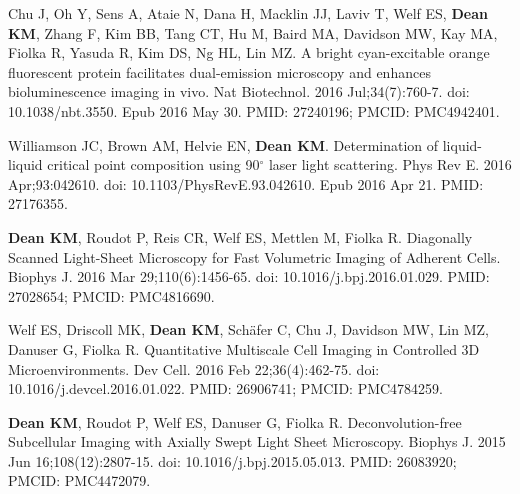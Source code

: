 \begin{etaremune}
\item Chu J, Oh Y, Sens A, Ataie N, Dana H, Macklin JJ, Laviv T, Welf ES, \textbf{Dean KM}, Zhang F, Kim BB, Tang CT, Hu M, Baird MA, Davidson MW, Kay MA, Fiolka R, Yasuda R, Kim DS, Ng HL, Lin MZ. A bright cyan-excitable orange fluorescent protein facilitates dual-emission microscopy and enhances bioluminescence imaging in vivo. Nat Biotechnol. 2016 Jul;34(7):760-7. doi: 10.1038/nbt.3550. Epub 2016 May 30. PMID: 27240196; PMCID: PMC4942401.

\item Williamson JC, Brown AM, Helvie EN, \textbf{Dean KM}. Determination of liquid-liquid critical point composition using 90$^\circ$ laser light scattering. Phys Rev E. 2016 Apr;93:042610. doi: 10.1103/PhysRevE.93.042610. Epub 2016 Apr 21. PMID: 27176355.

\item \textbf{Dean KM}, Roudot P, Reis CR, Welf ES, Mettlen M, Fiolka R. Diagonally Scanned Light-Sheet Microscopy for Fast Volumetric Imaging of Adherent Cells. Biophys J. 2016 Mar 29;110(6):1456-65. doi: 10.1016/j.bpj.2016.01.029. PMID: 27028654; PMCID: PMC4816690.

\item Welf ES, Driscoll MK, \textbf{Dean KM}, Sch\"{a}fer C, Chu J, Davidson MW, Lin MZ, Danuser G, Fiolka R. Quantitative Multiscale Cell Imaging in Controlled 3D Microenvironments. Dev Cell. 2016 Feb 22;36(4):462-75. doi: 10.1016/j.devcel.2016.01.022. PMID: 26906741; PMCID: PMC4784259.

\item \textbf{Dean KM}, Roudot P, Welf ES, Danuser G, Fiolka R. Deconvolution-free Subcellular Imaging with Axially Swept Light Sheet Microscopy. Biophys J. 2015 Jun 16;108(12):2807-15. doi: 10.1016/j.bpj.2015.05.013. PMID: 26083920; PMCID: PMC4472079.


\end{etaremune}
